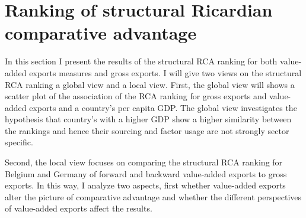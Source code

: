 \section{Ranking of structural Ricardian comparative advantage }
In this section I present the results of the structural RCA ranking for both value-added exports measures and gross exports.
I will give two views on the structural RCA ranking a global view and a local view.
First, the global view will shows a scatter plot of the association of the RCA ranking for gross exports and value-added exports and a country's per capita GDP.
The global view investigates the hypothesis that country's with a higher GDP show a higher similarity between the rankings and hence their sourcing and factor usage are not strongly sector specific. \par
Second, the local view focuses on comparing the structural RCA ranking for Belgium and Germany of forward and backward value-added exports to gross exports.
In this way, I analyze two aspects, first whether value-added exports alter the picture of comparative advantage and whether the different perspectives of value-added exports affect the results.
